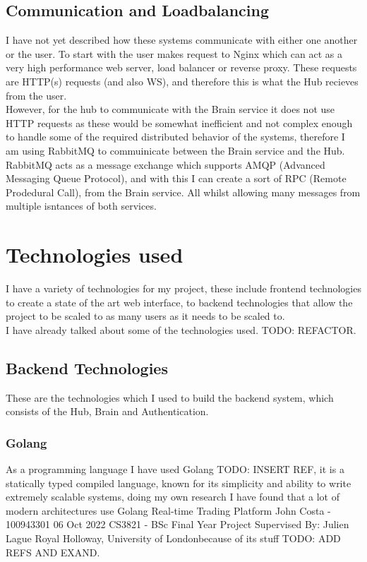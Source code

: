 \documentclass[titlepage]{article}
\begin{document}
\subsection{Communication and Loadbalancing}
I have not yet described how these systems communicate with either one another or the user. To start with the user makes request to Nginx which can act as a very high performance web server, load balancer or reverse proxy. These requests are HTTP(s) requests (and also WS), and therefore this is what the Hub recieves from the user. \\

However, for the hub to communicate with the Brain service it does not use HTTP requests as these would be somewhat inefficient and not complex enough to handle some of the required distributed behavior of the systems, therefore I am using RabbitMQ to commuinicate between the Brain service and the Hub. RabbitMQ acts as a message exchange which supports AMQP (Advanced Messaging Queue Protocol), and with this I can create a sort of RPC (Remote Prodedural Call), from the Brain service. All whilst allowing many messages from multiple isntances of both services. \\

\section{Technologies used}
I have a variety of technologies for my project, these include frontend technologies to create a state of the art web interface, to backend technologies that allow the project to be scaled to as many users as it needs to be scaled to. \\

I have already talked about some of the technologies used. TODO: REFACTOR.

\subsection{Backend Technologies}
These are the technologies which I used to build the backend system, which consists of the Hub, Brain and Authentication. \\

\subsubsection{Golang}
As a programming language I have used Golang TODO: INSERT REF, it is a statically typed compiled language, known for its simplicity and ability to write extremely scalable systems, doing my own research I have found that a lot of modern architectures use Golang Real-time Trading Platform
John Costa - 100943301
06 Oct 2022
CS3821 - BSc Final Year Project
Supervised By: Julien Lague
Royal Holloway, University of Londonbecause of its stuff TODO: ADD REFS AND EXAND. \\
\end{document}
